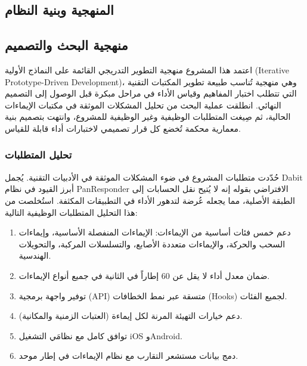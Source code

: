 \begin{Arabic}
\chapter{المنهجية وبنية النظام}
\clearpage

\section{منهجية البحث والتصميم}

اعتمد هذا المشروع منهجية التطوير التدريجي القائمة على النماذج الأولية (\textenglish{Iterative Prototype-Driven Development})، وهي منهجية تُناسب طبيعة تطوير المكتبات التقنية التي تتطلب اختبار المفاهيم وقياس الأداء في مراحل مبكرة قبل الوصول إلى التصميم النهائي. انطلقت عملية البحث من تحليل المشكلات الموثقة في مكتبات الإيماءات الحالية، ثم صِيغت المتطلبات الوظيفية وغير الوظيفية للمشروع، وانتهت بتصميم بنية معمارية محكمة تُخضع كل قرار تصميمي لاختبارات أداء قابلة للقياس.

\subsection{تحليل المتطلبات}

حُدّدت متطلبات المشروع في ضوء المشكلات الموثقة في الأدبيات التقنية. يُجمل \textenglish{Dabit} \cite{dabit2019} أبرز القيود في نظام \textenglish{PanResponder} الافتراضي بقوله إنه لا يُتيح نقل الحسابات إلى الطبقة الأصلية، مما يجعله عُرضة لتدهور الأداء في التطبيقات المكثفة. استُخلصت من هذا التحليل المتطلبات الوظيفية التالية:

\begin{enumerate}
    \item دعم خمس فئات أساسية من الإيماءات: الإيماءات المنفصلة الأساسية، وإيماءات السحب والحركة، والإيماءات متعددة الأصابع، والتسلسلات المركبة، والتحويلات الهندسية.
    \item ضمان معدل أداء لا يقل عن 60 إطاراً في الثانية في جميع أنواع الإيماءات.
    \item توفير واجهة برمجية (\textenglish{API}) متسقة عبر نمط الخطافات (\textenglish{Hooks}) لجميع الفئات.
    \item دعم خيارات التهيئة المرنة لكل إيماءة (العتبات الزمنية والمكانية).
    \item توافق كامل مع نظامَي التشغيل \textenglish{iOS} و\textenglish{Android}.
    \item دمج بيانات مستشعر التقارب مع نظام الإيماءات في إطار موحد.
\end{enumerate}


\end{Arabic}
